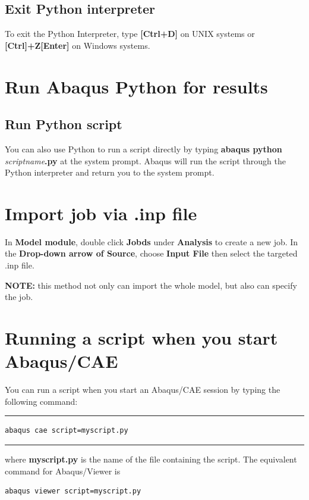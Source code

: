 \documentclass[10pt,a4paper]{article}
\begin{document}
\subsection{Exit Python interpreter}
To exit the Python Interpreter, type \textbf{[Ctrl+D]} on UNIX systems or \textbf{[Ctrl]+Z[Enter]} on Windows systems.

\section{Run Abaqus Python for results}
\subsection{Run Python script}
You can also use Python to run a script directly by typing \textbf{abaqus python} \textit{scriptname}\textbf{.py} at the system prompt. Abaqus will run the script through the Python interpreter and return you to the system prompt.

\section{Import job via .inp file}
In \textbf{Model module}, double click \textbf{Jobds} under \textbf{Analysis} to create a new job. In the \textbf{Drop-down arrow of Source}, choose \textbf{Input File} then select the targeted .inp file.

\textbf{NOTE:} this method not only can import the whole model, but also can specify the job.

\section{Running a script when you start Abaqus/CAE}
You can run a script when you start an Abaqus/CAE session by typing the following command:

\noindent\vspace{1em}\hrule
\begin{verbatim}
abaqus cae script=myscript.py
\end{verbatim}
\noindent\hrule\vspace{1em}

where \textbf{myscript.py} is the name of the file containing the script. The equivalent command for Abaqus/Viewer is

\begin{lstlisting}[language=command.com]
abaqus viewer script=myscript.py
\end{lstlisting}
\end{document}
